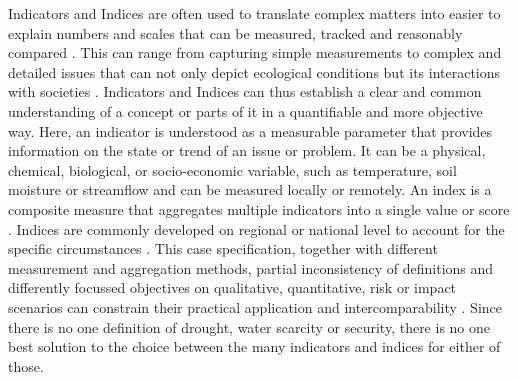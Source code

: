 Indicators and Indices are often used to translate complex matters into easier to explain numbers and scales that can be measured, tracked and reasonably compared \autocite{blauveltSystematizingEnvironmentalIndicators2014,williamsUsingIndicatorsExplain2017}. This can range from capturing simple measurements to complex and detailed issues that can not only depict ecological conditions but its interactions with societies \autocite{blauveltSystematizingEnvironmentalIndicators2014,mishraWaterSecurityChanging2021}. Indicators and Indices can thus establish a clear and common understanding of a concept or parts of it in a quantifiable and more objective way.
Here, an indicator is understood as a measurable parameter that provides information on the state or trend of an issue or problem. It can be a physical, chemical, biological, or socio-economic variable, such as temperature, soil moisture or streamflow and can be measured locally or remotely. An index is a composite measure that aggregates multiple indicators into a single value or score \autocite{unitednationsuniversityTooManyIndicators2017,williamsUsingIndicatorsExplain2017, svobodaHandbookDroughtIndicators2016}. Indices are commonly developed on regional or national level to account for the specific circumstances \autocite{unitednationsuniversityTooManyIndicators2017}. This case specification, together with different measurement and aggregation methods, partial inconsistency of definitions and differently focussed objectives on qualitative, quantitative, risk or impact scenarios can constrain their practical application and intercomparability \autocite{svobodaHandbookDroughtIndicators2016,unitednationsuniversityTooManyIndicators2017}. 
Since there is no one definition of drought, water scarcity or security, there is no one best solution to the choice between the many indicators and indices for either of those.

